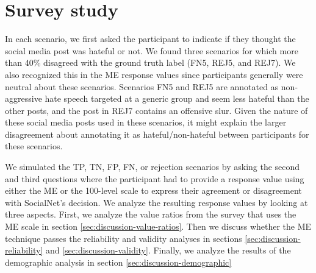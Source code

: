 \section{Survey study}
\label{sec:discussion-survey}
%
In each scenario, we first asked the participant to indicate if they thought the social media post was hateful or not.
%
We found three scenarios for which more than 40\% disagreed with the ground truth label (FN5, REJ5, and REJ7).
%
We also recognized this in the ME response values since participants generally were neutral about these scenarios.
%
Scenarios FN5 and REJ5 are annotated as non-aggressive hate speech targeted at a generic group and seem less hateful than the other posts, and the post in REJ7 contains an offensive slur.
%
Given the nature of these social media posts used in these scenarios, it might explain the larger disagreement about annotating it as hateful/non-hateful between participants for these scenarios.
%

%
We simulated the TP, TN, FP, FN, or rejection scenarios by asking the second and third questions where the participant had to provide a response value using either the ME or the 100-level scale to express their agreement or disagreement with SocialNet's decision.
%
We analyze the resulting response values by looking at three aspects.
%
First, we analyze the value ratios from the survey that uses the ME scale in section \ref{sec:discussion-value-ratios}.
%
Then we discuss whether the ME technique passes the reliability and validity analyses in sections \ref{sec:discussion-reliability} and \ref{sec:discussion-validity}.
%
Finally, we analyze the results of the demographic analysis in section \ref{sec:discussion-demographic}


